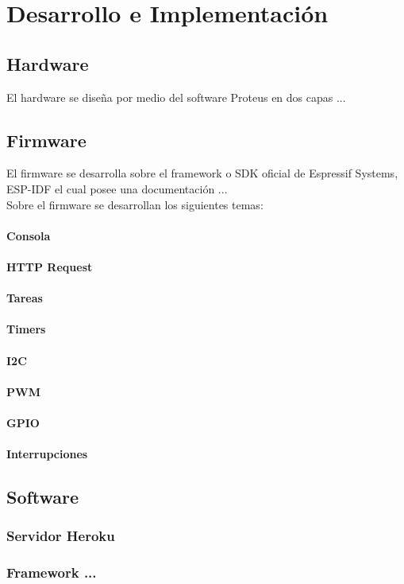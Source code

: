 \chapter{Desarrollo e Implementación}

\section{Hardware}

El hardware se diseña por medio del software Proteus en dos capas ...

\section{Firmware}

El firmware se desarrolla sobre el framework o SDK oficial de Espressif Systems, ESP-IDF el cual posee una documentación ...\\

Sobre el firmware se desarrollan los siguientes temas:

\subsubsection{Consola}

\subsubsection{HTTP Request}

\subsubsection{Tareas}

\subsubsection{Timers}

\subsubsection{I2C}

\subsubsection{PWM}

\subsubsection{GPIO}

\subsubsection{Interrupciones}

\section{Software}

\subsection{Servidor Heroku}

\subsection{Framework ...}
